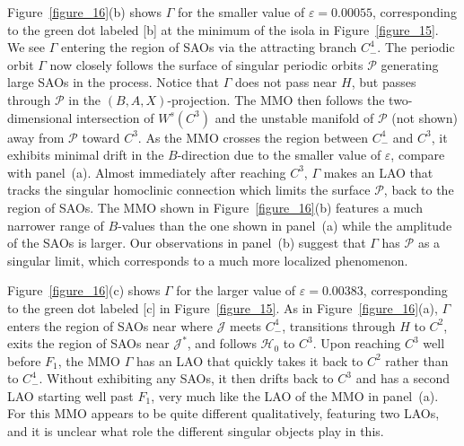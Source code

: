 \documentclass{ws-ijbc}
\begin{document}
Figure~\ref{figure_16}(b) shows $\Gamma$ for the smaller value of $\varepsilon=0.00055$, corresponding to the green dot labeled [b] at the minimum of the isola in Figure~\ref{figure_15}.  We see $\Gamma$ entering the region of SAOs via the attracting branch $C^4_-$.  The periodic orbit $\Gamma$ now closely follows the surface of singular periodic orbits $\mathscr{P}$ generating large SAOs in the process.  Notice that $\Gamma$ does not pass near $H$, but passes through $\mathscr{P}$ in the $(B,A,X)$-projection.  The MMO then follows the two-dimensional intersection of $W^s(C^3)$ and the unstable manifold of $\mathscr{P}$ (not shown) away from $\mathscr{P}$ toward $C^3$.  As the MMO crosses the region between $C^4_-$ and $C^3$, it exhibits minimal drift in the $B$-direction due to the smaller value of $\varepsilon$, compare with panel~(a).  Almost immediately after reaching $C^3$, $\Gamma$ makes an LAO that tracks the singular homoclinic connection which limits the surface $\mathscr{P}$, back to the region of SAOs.  The MMO shown in Figure~\ref{figure_16}(b) features a much narrower range of $B$-values than the one shown in panel~(a) while the amplitude of the SAOs is larger.  Our observations in panel~(b) suggest that $\Gamma$ has $\mathscr{P}$ as a singular limit, which corresponds to a much more localized phenomenon.

Figure~\ref{figure_16}(c) shows $\Gamma$ for the larger value of $\varepsilon=0.00383$, corresponding to the green dot labeled [c] in Figure~\ref{figure_15}.  As in Figure~\ref{figure_16}(a), $\Gamma$ enters the region of SAOs near where $\mathscr{J}$ meets $C^4_-$, transitions through $H$ to $C^2$, exits the region of SAOs near $\mathscr{J}^*$, and follows $\mathscr{H}_0$ to $C^3$.  Upon reaching $C^3$ well before $F_1$, the MMO $\Gamma$ has an LAO that quickly takes it back to $C^2$ rather than to $C^4_-$.  Without exhibiting any SAOs, it then drifts back to $C^3$ and has a second LAO starting well past $F_1$, very much like the LAO of the MMO in panel~(a).  For this MMO appears to be quite different qualitatively, featuring two LAOs, and it is unclear what role the different singular objects play in this.
\end{document}
